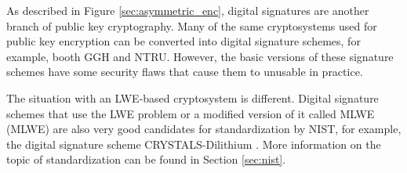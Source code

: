 As described in Figure \ref{sec:asymmetric_enc}, digital signatures are another branch of public key cryptography. Many of the same cryptosystems used for public key encryption can be converted into digital signature schemes, for example, booth GGH and NTRU. However, the basic versions of these signature schemes have some security flaws that cause them to unusable in practice. \cite{Bernstein2009}

The situation with an LWE-based cryptosystem is different. Digital signature schemes that use the LWE problem or a modified version of it called MLWE (\acl{MLWE}) are also very good candidates for standardization by NIST, for example, the digital signature scheme CRYSTALS-Dilithium \cite{Grimes2020}. More information on the topic of standardization can be found in Section \ref{sec:nist}.
